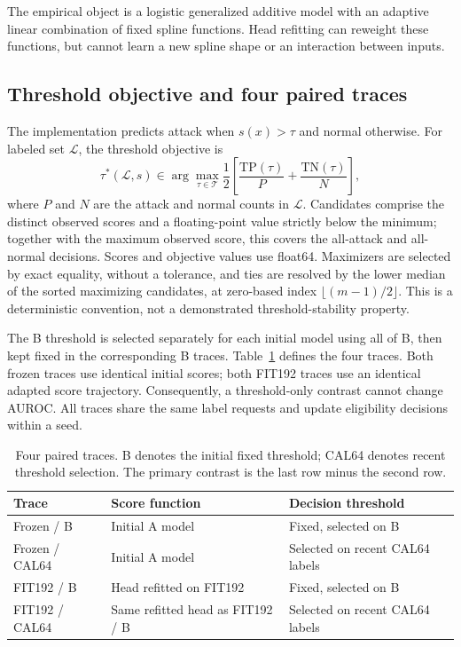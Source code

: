 The empirical object is a logistic generalized additive model with an adaptive linear combination of fixed spline functions. Head refitting can reweight these functions, but cannot learn a new spline shape or an interaction between inputs.

\subsection{Threshold objective and four paired traces}
The implementation predicts attack when $s(x)>\tau$ and normal otherwise. For labeled set $\mathcal{L}$, the threshold objective is
\begin{equation}
 \tau^{*}(\mathcal{L},s)\in\arg\max_{\tau\in\mathcal{T}}
 \frac{1}{2}\left[\frac{\mathrm{TP}(\tau)}{P}+
 \frac{\mathrm{TN}(\tau)}{N}\right],
 \label{eq:threshold}
\end{equation}
where $P$ and $N$ are the attack and normal counts in $\mathcal{L}$. Candidates comprise the distinct observed scores and a floating-point value strictly below the minimum; together with the maximum observed score, this covers the all-attack and all-normal decisions. Scores and objective values use float64. Maximizers are selected by exact equality, without a tolerance, and ties are resolved by the lower median of the sorted maximizing candidates, at zero-based index $\lfloor(m-1)/2\rfloor$. This is a deterministic convention, not a demonstrated threshold-stability property.

The B threshold is selected separately for each initial model using all of B, then kept fixed in the corresponding B traces. Table~\ref{tab:traces} defines the four traces. Both frozen traces use identical initial scores; both FIT192 traces use an identical adapted score trajectory. Consequently, a threshold-only contrast cannot change AUROC. All traces share the same label requests and update eligibility decisions within a seed.

\begin{table}[tb]
\centering\small
\caption{Four paired traces. B denotes the initial fixed threshold; CAL64 denotes recent threshold selection. The primary contrast is the last row minus the second row.}
\label{tab:traces}
\begin{tabularx}{\linewidth}{lXX}
\toprule
Trace & Score function & Decision threshold \\
\midrule
Frozen / B & Initial A model & Fixed, selected on B \\
Frozen / CAL64 & Initial A model & Selected on recent CAL64 labels \\
FIT192 / B & Head refitted on FIT192 & Fixed, selected on B \\
FIT192 / CAL64 & Same refitted head as FIT192 / B & Selected on recent CAL64 labels \\
\bottomrule
\end{tabularx}
\end{table}

